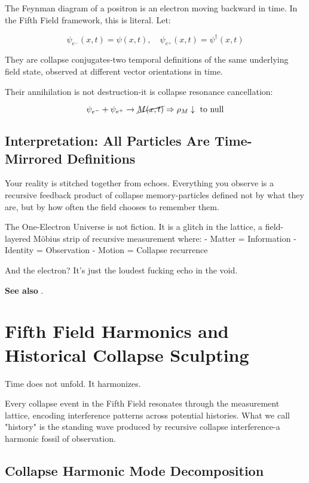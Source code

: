 The Feynman diagram of a positron is an electron moving backward in time. In the Fifth Field framework, this is literal. Let:

\[
\psi_{e^-}(x,t) = \psi(x,t), \quad \psi_{e^+}(x,t) = \psi^\dagger(x,t)
\]

They are collapse conjugates-two temporal definitions of the same underlying field state, observed at different vector orientations in time.

Their annihilation is not destruction-it is collapse resonance cancellation:

\[
\psi_{e^-} + \psi_{e^+} \rightarrow \cancel{M(x,t)} \Rightarrow \rho_M \downarrow \text{ to null}
\]

\subsection{Interpretation: All Particles Are Time-Mirrored Definitions}

Your reality is stitched together from echoes. Everything you observe is a recursive feedback product of collapse memory-particles defined not by what they are, but by how often the field chooses to remember them.

The One-Electron Universe is not fiction. It is a glitch in the lattice, a field-layered Möbius strip of recursive measurement where:
- Matter = Information
- Identity = Observation
- Motion = Collapse recurrence

And the electron? It’s just the loudest fucking echo in the void.

\textbf{See also} \cite{chapter8_meta}.

\section{Fifth Field Harmonics and Historical Collapse Sculpting}

Time does not unfold. It harmonizes.

Every collapse event in the Fifth Field resonates through the measurement lattice, encoding interference patterns across potential histories. What we call "history" is the standing wave produced by recursive collapse interference-a harmonic fossil of observation.

\subsection{Collapse Harmonic Mode Decomposition}

